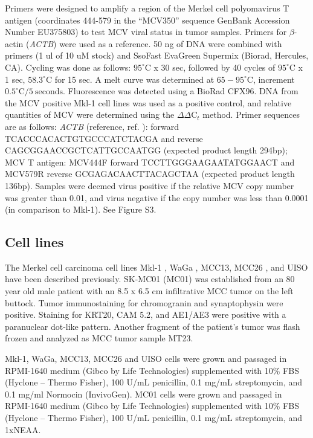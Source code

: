 \documentclass[10pt]{article}
\begin{document}
Primers were designed to amplify a  region of the Merkel cell polyomavirus T antigen (coordinates 444-579 in the ``MCV350'' sequence GenBank Accession Number EU375803) to test MCV viral status in tumor samples.
Primers for $\beta$-actin (\emph{ACTB}) were used as a reference.
50 ng of DNA were combined with primers (1 ul of 10 uM stock) and SsoFast EvaGreen Supermix (Biorad, Hercules, CA).
Cycling was done as follows: $95^{\circ}\mathrm{C}$ x 30 sec, followed by 40 cycles of $95^{\circ}\mathrm{C}$ x 1 sec, $58.3^{\circ}\mathrm{C}$ for 15 sec.
A melt curve was determined at $65-95^{\circ}\mathrm{C}$, increment $0.5^{\circ}\mathrm{C}/5\mathrm{~seconds}$.
Fluorescence was detected using a BioRad CFX96.
DNA from the MCV positive Mkl-1 cell lines was used as a positive control, and relative quantities of MCV were determined using the $\Delta\Delta\mathrm{C}_t$ method.
Primer sequences are as follows: \emph{ACTB} (reference, ref. \citep{Huang2007Expression}): forward TCACCCACACTGTGCCCATCTACGA and reverse CAGCGGAACCGCTCATTGCCAATGG (expected product length 294bp);
MCV T antigen: MCV444F forward TCCTTGGGAAGAATATGGAACT and MCV579R reverse GCGAGACAACTTACAGCTAA (expected product length 136bp).
Samples were deemed virus positive if the relative MCV copy number was greater than 0.01, and virus negative if the copy number was less than 0.0001 (in comparison to Mkl-1).
See Figure S3.

\subsection*{Cell lines}
The Merkel cell carcinoma cell lines Mkl-1 \citep{Rosen1987Establishment}, WaGa \citep{Houben2010Merkel}, MCC13, MCC26 \citep{Leonard1995Characterisation}, and UISO \citep{Ronan1993Merkel} have been described previously.
SK-MC01 (MC01) was established from an 80 year old male patient with an 8.5 x 6.5 cm infiltrative MCC tumor on the left buttock.
Tumor immunostaining for chromogranin and synaptophysin were positive.
Staining for KRT20, CAM 5.2, and AE1/AE3 were positive with a paranuclear dot-like pattern.
Another fragment of the patient’s tumor was flash frozen and analyzed as MCC tumor sample MT23.

Mkl-1, WaGa, MCC13, MCC26 and UISO cells were grown and passaged in RPMI-1640 medium (Gibco by Life Technologies) supplemented with 10\% FBS (Hyclone – Thermo Fisher), 100 U/mL penicillin, 0.1 mg/mL streptomycin, and 0.1 mg/ml Normocin (InvivoGen).
MC01 cells were grown and passaged in RPMI-1640 medium (Gibco by Life Technologies) supplemented with 10\% FBS (Hyclone – Thermo Fisher), 100 U/mL penicillin, 0.1 mg/mL streptomycin, and 1xNEAA.
\end{document}
